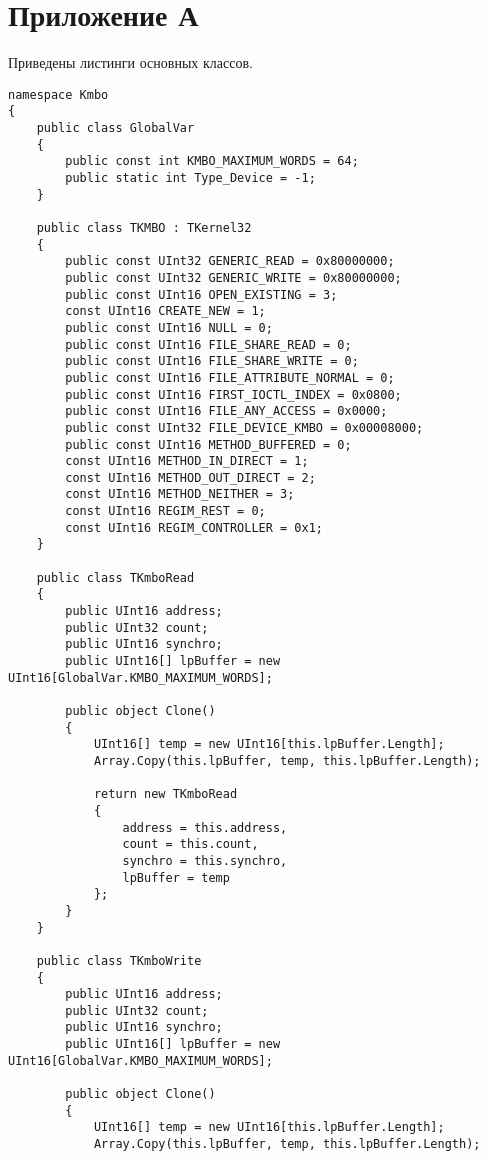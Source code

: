 \section*{\hfill Приложение А \hfill}
Приведены листинги основных классов.

\begin{lstlisting}[label=kmbo,caption=Основные функции КМБО]
namespace Kmbo
{
	public class GlobalVar
	{
		public const int KMBO_MAXIMUM_WORDS = 64;      
		public static int Type_Device = -1;
	}
	
	public class TKMBO : TKernel32
	{
		public const UInt32 GENERIC_READ = 0x80000000;
		public const UInt32 GENERIC_WRITE = 0x80000000;
		public const UInt16 OPEN_EXISTING = 3;
		const UInt16 CREATE_NEW = 1;
		public const UInt16 NULL = 0;
		public const UInt16 FILE_SHARE_READ = 0;
		public const UInt16 FILE_SHARE_WRITE = 0;
		public const UInt16 FILE_ATTRIBUTE_NORMAL = 0;
		public const UInt16 FIRST_IOCTL_INDEX = 0x0800;
		public const UInt16 FILE_ANY_ACCESS = 0x0000;
		public const UInt32 FILE_DEVICE_KMBO = 0x00008000;
		public const UInt16 METHOD_BUFFERED = 0;
		const UInt16 METHOD_IN_DIRECT = 1;
		const UInt16 METHOD_OUT_DIRECT = 2;
		const UInt16 METHOD_NEITHER = 3;
		const UInt16 REGIM_REST = 0;                                         
		const UInt16 REGIM_CONTROLLER = 0x1;                              
	}
	
	public class TKmboRead
	{
		public UInt16 address;                         
		public UInt32 count;                            
		public UInt16 synchro;                          
		public UInt16[] lpBuffer = new UInt16[GlobalVar.KMBO_MAXIMUM_WORDS];
		
		public object Clone()
		{
			UInt16[] temp = new UInt16[this.lpBuffer.Length];
			Array.Copy(this.lpBuffer, temp, this.lpBuffer.Length);
			
			return new TKmboRead
			{
				address = this.address,
				count = this.count,
				synchro = this.synchro,
				lpBuffer = temp
			};
		}
	}
	
	public class TKmboWrite                             
	{
		public UInt16 address;                          
		public UInt32 count;                            
		public UInt16 synchro;                          
		public UInt16[] lpBuffer = new UInt16[GlobalVar.KMBO_MAXIMUM_WORDS];    
		
		public object Clone()
		{
			UInt16[] temp = new UInt16[this.lpBuffer.Length];
			Array.Copy(this.lpBuffer, temp, this.lpBuffer.Length);
			

\end{lstlisting}
